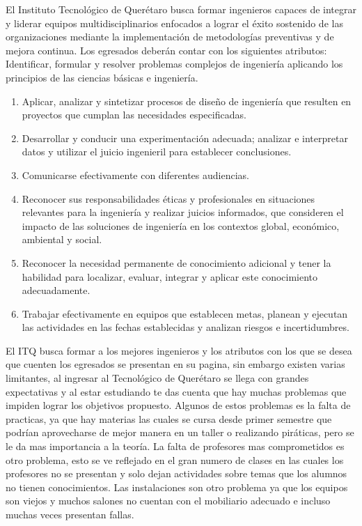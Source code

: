         El Instituto Tecnológico de Querétaro busca formar ingenieros capaces de integrar y liderar equipos multidisciplinarios enfocados a lograr el éxito sostenido de las organizaciones mediante la implementación de metodologías preventivas y de mejora continua. Los egresados deberán contar con los siguientes atributos: 
        Identificar, formular y resolver problemas complejos de ingeniería aplicando los principios de las ciencias básicas e ingeniería.
    \begin{enumerate}
        \item Aplicar, analizar y sintetizar procesos de diseño de ingeniería que resulten en proyectos que cumplan las necesidades especificadas.
        \item Desarrollar y conducir una experimentación adecuada; analizar e interpretar datos y utilizar el juicio ingenieril para establecer conclusiones.
        \item Comunicarse efectivamente con diferentes audiencias.
        \item Reconocer sus responsabilidades éticas y profesionales en situaciones relevantes para la ingeniería y realizar juicios informados, que consideren el impacto de las soluciones de ingeniería en los contextos global, económico, ambiental y social.
        \item Reconocer la necesidad permanente de conocimiento adicional y tener la habilidad para localizar, evaluar, integrar y aplicar este conocimiento adecuadamente.
        \item Trabajar efectivamente en equipos que establecen metas, planean y ejecutan las actividades en las fechas establecidas y analizan riesgos e incertidumbres.\cite{itq}
    \end{enumerate}
        El ITQ busca formar a los mejores ingenieros y los atributos con los que se desea que cuenten los egresados se presentan en su pagina, sin embargo existen varias limitantes, al ingresar al Tecnológico de Querétaro se llega con grandes expectativas y al estar estudiando te das cuenta que hay muchas problemas que impiden lograr los objetivos propuesto.
        Algunos de estos problemas es la falta de practicas, ya que hay materias las cuales se cursa desde primer semestre que podrían aprovecharse de mejor manera en un taller o realizando piráticas, pero se le da mas importancia a la teoría.
        La falta de profesores mas comprometidos es otro problema, esto se ve reflejado en el gran numero de clases en las cuales los profesores no se presentan y solo dejan actividades sobre temas que los alumnos no tienen conocimientos.
        Las instalaciones son otro problema ya que los equipos son viejos y muchos salones no cuentan con el mobiliario adecuado e incluso muchas veces presentan fallas.
